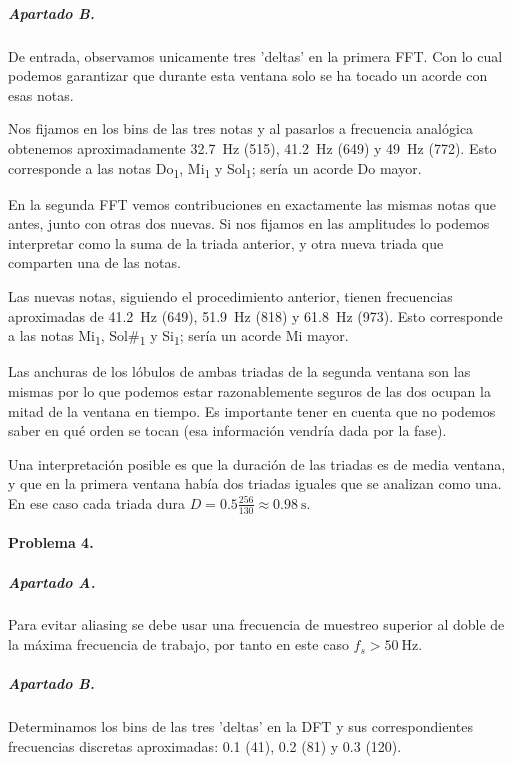 \subparagraph{Apartado B.}

De entrada, observamos unicamente tres 'deltas' en la primera FFT. Con lo cual
podemos garantizar que durante esta ventana solo se ha tocado un acorde con
esas notas.

Nos fijamos en los bins de las tres notas y al pasarlos a frecuencia analógica
obtenemos aproximadamente \SI{32.7}{\hertz} (\num{515}), \SI{41.2}{\hertz}
(\num{649}) y \SI{49}{\hertz} (\num{772}). Esto corresponde a las notas
Do\textsubscript{1}, Mi\textsubscript{1} y Sol\textsubscript{1}; sería un
acorde Do mayor.

En la segunda FFT vemos contribuciones en exactamente las mismas notas que
antes, junto con otras dos nuevas. Si nos fijamos en las amplitudes lo podemos
interpretar como la suma de la triada anterior, y otra nueva triada que
comparten una de las notas.

Las nuevas notas, siguiendo el procedimiento anterior, tienen frecuencias
aproximadas de \SI{41.2}{\hertz} (\num{649}), \SI{51.9}{\hertz} (\num{818}) y
\SI{61.8}{\hertz} (\num{973}). Esto corresponde a las notas
Mi\textsubscript{1}, Sol\#\textsubscript{1} y Si\textsubscript{1}; sería un
acorde Mi mayor.

Las anchuras de los lóbulos de ambas triadas de la segunda ventana son las
mismas por lo que podemos estar razonablemente seguros de las dos ocupan la
mitad de la ventana en tiempo. Es importante tener en cuenta que no podemos
saber en qué orden se tocan (esa información vendría dada por la fase).

Una interpretación posible es que la duración de las triadas es de media
ventana, y que en la primera ventana había dos triadas iguales que se analizan
como una. En ese caso cada triada dura $D = \num{0.5} \frac{256}{130}
\approx \SI{0.98}{\second}$.

\finishpage
\startpage

\paragraph{Problema 4.}

\subparagraph{Apartado A.}

Para evitar aliasing se debe usar una frecuencia de muestreo superior al doble
de la máxima frecuencia de trabajo, por tanto en este caso $f_s >
\SI{50}{\hertz}$.

\subparagraph{Apartado B.}

Determinamos los bins de las tres 'deltas' en la DFT y sus correspondientes
frecuencias discretas aproximadas: \num{0.1} (\num{41}), \num{0.2} (\num{81})
y \num{0.3} (\num{120}).

